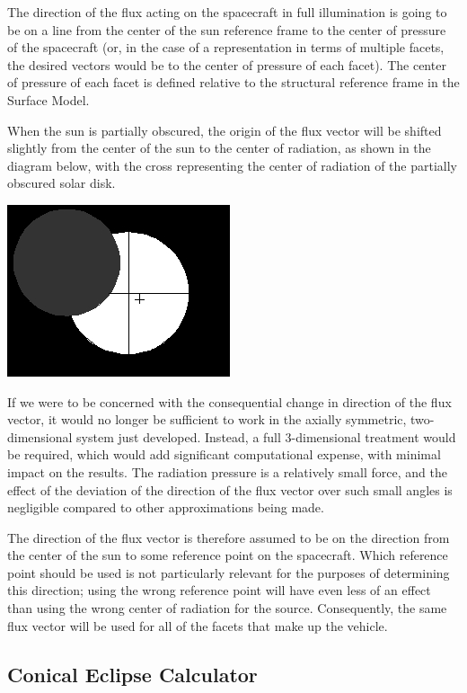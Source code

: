    The direction of the flux acting on the spacecraft in full illumination
   is going to be on a line from the center of the sun reference frame to
   the center of pressure of the spacecraft (or, in the case of a
   representation in terms of multiple facets, the desired vectors
   would be to the center of pressure of each facet).
   The center of pressure of each facet is
   defined relative to the structural reference frame in the Surface Model.

   When the sun is partially obscured, the origin of the flux vector will
   be shifted slightly from the center of the sun to the center of
   radiation, as shown in the diagram below, with the cross representing the
   center of radiation of the partially obscured solar disk.

   \includegraphics{figs/shadow/shadow_seeker_fig11.jpg}

   If we were to be concerned with the consequential change in direction of the
   flux vector, it would no longer be sufficient to work in the
   axially symmetric, two{}-dimensional system just developed.
   Instead, a full 3{}-dimensional treatment would be required, which would
   add significant computational expense, with minimal impact on the results.
   The radiation pressure is a relatively small force, and the
   effect of the deviation of the direction of the flux vector over such
   small angles is negligible compared to other approximations being made.

   The direction of the flux vector is therefore assumed to be on the
   direction from the center of the sun to some reference point on the
   spacecraft.  Which reference point should be used is not particularly
   relevant for the purposes of determining this direction; using the
   wrong reference point will have even less of an effect than using the
   wrong center of radiation for the source.  Consequently, the same flux
   vector will be used for all of the facets that make up the vehicle.

  \subsection{Conical Eclipse Calculator}\label{sec:conicaleclipsecalculator}

